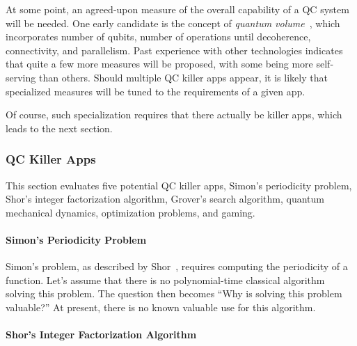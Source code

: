 At some point, an agreed-upon measure of the overall capability of a
QC system will be needed.
One early candidate is the concept of
\emph{quantum volume}~\cite{LevSBishop2017QuantumVolume}, which
incorporates number of qubits, number of operations until decoherence,
connectivity, and parallelism.
Past experience with other technologies indicates that quite a few more
measures will be proposed, with some being more self-serving than others.
Should multiple QC killer apps appear, it is likely that specialized
measures will be tuned to the requirements of a given app.

Of course, such specialization requires that there actually be killer
apps, which leads to the next section.

\subsubsection{QC Killer Apps}
\label{sec:future:QC Killer Apps}

This section evaluates five potential QC killer apps,
Simon's periodicity problem,
Shor's integer factorization algorithm,
Grover's search algorithm,
quantum mechanical dynamics,
optimization problems, and
gaming.

\paragraph{Simon's Periodicity Problem}
\label{sec:future:Simon's Periodicity Problem}

Simon's problem, as described by
Shor~\cite{PeterWSchor2001QuantumAlgorithms},
requires computing the periodicity of a function.
Let's assume that there is no polynomial-time classical
algorithm solving this problem.
The question then becomes ``Why is solving this problem valuable?''
At present, there is no known valuable use for this algorithm.

\paragraph{Shor's Integer Factorization Algorithm}
\label{sec:future:Shor's Integer Factorization Algorithm}

